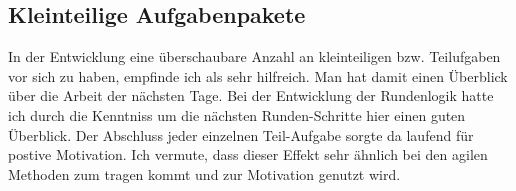 \subsection{Kleinteilige Aufgabenpakete} 

In der Entwicklung eine überschaubare Anzahl an kleinteiligen bzw. Teilufgaben vor sich zu haben, empfinde ich als sehr hilfreich. Man hat damit einen Überblick über die Arbeit der nächsten Tage. Bei der Entwicklung der Rundenlogik hatte ich durch die Kenntniss um die nächsten Runden-Schritte hier einen guten Überblick. Der Abschluss jeder einzelnen Teil-Aufgabe sorgte da laufend für postive Motivation. 
Ich vermute, dass dieser Effekt sehr ähnlich bei den agilen Methoden zum tragen kommt und zur Motivation genutzt wird. 


